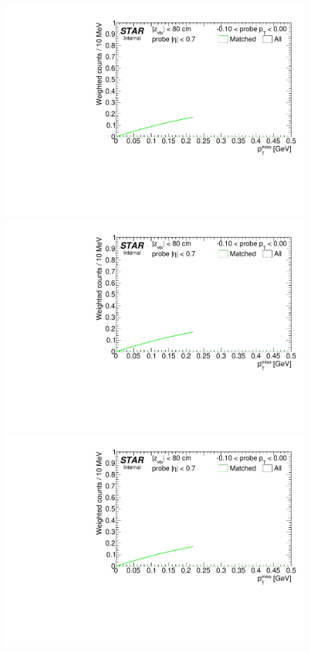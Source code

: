 \begin{figure}[h!]
{}~
\parbox{0.24\textwidth}{
  \centering
  \includegraphics[width=\linewidth,page=6]{graphics/correctionsToEff/TOF_tagAndProbe/Fitting_effVsPt_mc.CPT2.pdf}\\
  \includegraphics[width=\linewidth,page=8]{graphics/correctionsToEff/TOF_tagAndProbe/Fitting_effVsPt_mc.CPT2.pdf}\\
  \includegraphics[width=\linewidth,page=10]{graphics/correctionsToEff/TOF_tagAndProbe/Fitting_effVsPt_mc.CPT2.pdf}\\[84pt]

}%
\end{figure}
